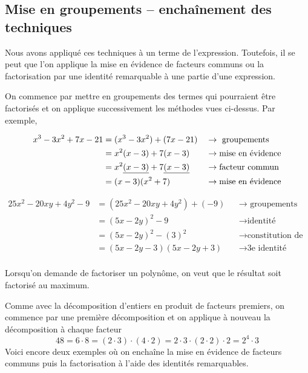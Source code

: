 \documentclass[a4paper,12pt]{report}
\begin{document}
\subsection{Mise en groupements -- enchaînement des techniques}
Nous avons appliqué ces techniques à un terme de l'expression.
Toutefois, il se peut que l'on applique la mise en évidence de facteurs communs ou la factorisation par une identité remarquable à une partie d'une expression. 

On commence par mettre en groupements des termes qui pourraient être factorisés et on applique successivement les méthodes vues ci-dessus.
Par exemple,
\begin{tasks}
	\task \vspace{-2em}\begin{align*}
	x^3-3x^2+7x-21&=(x^3-3x^2)+(7x-21) &&\rightarrow\text{ groupements}\\
		      &=x^2(x-3)+7(x-3)&&\rightarrow \text{mise en évidence}\\
		      &=x^2\uline{(x-3)}+7\uline{(x-3)}&&\rightarrow \text{facteur commun}\\
		      &=(x-3)(x^2+7)&&\rightarrow \text{mise en évidence}
\end{align*}

\task	
\vspace{-2em}\begin{align*}
	25x^2-20xy+4y^2-9&=(25x^2-20xy+4y^2)+(-9)&&\rightarrow \text{ groupements}\\
		      &=(5x-2y)^2-9&&\rightarrow \text{identité remarquable}\\
		      &=(5x-2y)^2-(3)^2&& \rightarrow \text{constitution de l'identité}\\
		      &=(5x-2y-3)(5x-2y+3)&&\rightarrow \text{3e identité remarquable}\\
\end{align*}
		\end{tasks}
		\vspace{-1cm}
\begin{rem}
	Lorsqu'on demande de factoriser un polynôme, on veut que le résultat soit factorisé au maximum. 
\end{rem}
Comme avec la décomposition d'entiers en produit de facteurs premiers, on commence par une première décomposition et on applique à nouveau la décomposition à chaque facteur
	\[
	48=6\cdot 8=(2\cdot 3)\cdot (4\cdot 2)=2\cdot 3\cdot (2\cdot 2)\cdot 2=2^4\cdot 3	
\]
Voici encore deux exemples où on enchaîne la mise en évidence de facteurs communs puis la factorisation à l'aide des identités remarquables.
\end{document}
